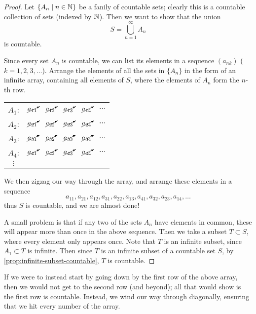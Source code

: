 \begin{proof}
Let $\{A_n\mid n\in\mathbb N\}$ be a fanily of countable sets; clearly this is a countable collection of sets (indexed by $\mathbb N$). Then we want to show that the union
\[S=\bigcup_{n=1}^\infty A_n\]
is countable.

Since every set $A_n$ is countable, we can list its elements in a sequence $(a_{nk})$ ($k=1,2,3,\dots$). Arrange the elements of all the sets in $\{A_n\}$ in the form of an infinite array, containing all elements of $S$, where the elements of $A_n$ form the $n$-th row.
\begin{table}[H]
\centering
\begin{tabular}{cccccc}
$A_1$:&$\cancelto{}{a_{11}}$ & $\cancelto{}{a_{12}}$ & $\cancelto{}{a_{13}}$ & $\cancelto{}{a_{14}}$ & $\cdots$\\
$A_2$:&$\cancelto{}{a_{21}}$ & $\cancelto{}{a_{22}}$ & $\cancelto{}{a_{23}}$ & $\cancelto{}{a_{24}}$ & $\cdots$\\
$A_3$:&$\cancelto{}{a_{31}}$ & $\cancelto{}{a_{32}}$ & $\cancelto{}{a_{33}}$ & $\cancelto{}{a_{34}}$ & $\cdots$\\
$A_4$:&$\cancelto{}{a_{41}}$ & $\cancelto{}{a_{42}}$ & $\cancelto{}{a_{43}}$ & $\cancelto{}{a_{44}}$ & $\cdots$\\
$\vdots$ & & & & &
\end{tabular}
\end{table}
We then zigzag our way through the array, and arrange these elements in a sequence
\[a_{11},a_{21},a_{12},a_{31},a_{22},a_{13},a_{41},a_{32},a_{23},a_{14},\dots\]
thus $S$ is countable, and we are almost done!

A small problem is that if any two of the sets $A_n$ have elements in common, these will appear more than once in the above sequence. Then we take a subset $T\subset S$, where every element only appears once. Note that $T$ is an infinite subset, since $A_1\subset T$ is infinite. Then since $T$ is an infinite subset of a countable set $S$, by \cref{prop:infinite-subset-countable}, $T$ is countable.
\end{proof}

\begin{remark}
If we were to instead start by going down by the first row of the above array, then we would not get to the second row (and beyond); all that would show is the first row is countable. Instead, we wind our way through diagonally, ensuring that we hit every number of the array.
\end{remark}

